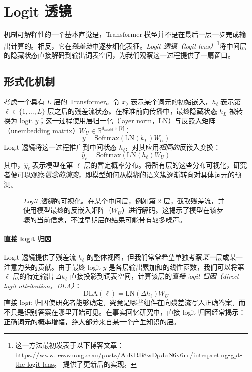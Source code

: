 \section{Logit 透镜}

机制可解释性的一个基本直觉是，Transformer 模型并不是在最后一层一步完成输出计算的。相反，它在\emph{残差流}中逐步细化表征。\textit{Logit 透镜（logit lens）}\footnote{这一方法最初发表于以下博客文章：\url{https://www.lesswrong.com/posts/AcKRB8wDpdaN6v6ru/interpreting-gpt-the-logit-lens}。\citep{wang2025logitlens4llmsextendinglogitlens} 提供了更新后的实现。}将中间层的隐藏状态直接解码到输出词表空间，为我们观察这一过程提供了一扇窗口。

\subsection{形式化机制}
考虑一个具有 $L$ 层的 Transformer。令 $x_0$ 表示某个词元的初始嵌入，$h_\ell$ 表示第 $\ell \in \{1, \dots, L\}$ 层之后的残差流状态。在标准前向传播中，最终隐藏状态 $h_L$ 被转换为 logit $y$；这一过程使用层归一化（layer norm，LN）与反嵌入矩阵（unembedding matrix）$W_U \in \mathbb{R}^{d_{model} \times |V|}$：
\begin{equation}
    y = \text{Softmax}(\text{LN}(h_L) W_U)
\end{equation}
Logit 透镜将这一过程推广到中间状态 $h_\ell$，对其应用\emph{相同的}反嵌入变换：
\begin{equation}
    \hat{y}_\ell = \text{Softmax}(\text{LN}(h_\ell) W_U)
\end{equation}
其中，$\hat{y}_\ell$ 表示模型在第 $\ell$ 层的暂定概率分布。将所有层的这些分布可视化，研究者便可以观察\emph{信念的演变}，即模型如何从模糊的语义簇逐渐转向对具体词元的预测。

\begin{figure}[!ht]
    \centering
    
    \caption{\emph{Logit 透镜}的可视化。在某个中间层，例如第 2 层，截取残差流，并使用模型最终的反嵌入矩阵（$W_U$）进行解码。这揭示了模型在该步骤的当前信念，不过早期层的结果可能带有较多噪声。}
    \label{fig:logit_lens}
\end{figure}


\paragraph{直接 logit 归因}
Logit 透镜提供了残差流 $h_\ell$ 的整体视图，但我们常常希望单独考察\emph{某一}层或某一注意力头的贡献。由于最终 logit $y$ 是各层输出累加和的线性函数，我们可以将第 $\ell$ 层的特定输出 $\Delta h_\ell$ 直接投影到词表空间，计算该层的\emph{直接 logit 归因（direct logit attribution，DLA）}：
\begin{equation}
    \text{DLA}(\ell) = \text{LN}(\Delta h_\ell) W_U
\end{equation}
直接 logit 归因使研究者能够确定，究竟是哪些组件在向残差流写入正确答案，而不只是识别答案在哪里开始可见。在事实回忆研究中，直接 logit 归因经常揭示：正确词元的概率增幅，绝大部分来自某一个产生知识的层。


